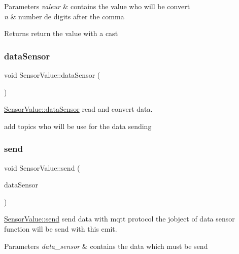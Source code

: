 \begin{DoxyParams}{Parameters}
{\em valeur} & contains the value who will be convert \\
\hline
{\em n} & number de digits after the comma \\
\hline
\end{DoxyParams}
\begin{DoxyReturn}{Returns}
return the value with a cast 
\end{DoxyReturn}
\mbox{\label{classSensorValue_af24ff9ad2ade8fe703c4d67ae91fe3b5}} 
\subsubsection{\texorpdfstring{data\+Sensor}{dataSensor}}
{\footnotesize\ttfamily void Sensor\+Value\+::data\+Sensor (\begin{DoxyParamCaption}{ }\end{DoxyParamCaption})\hspace{0.3cm}{\ttfamily [slot]}}



\hyperlink{classSensorValue_af24ff9ad2ade8fe703c4d67ae91fe3b5}{Sensor\+Value\+::data\+Sensor} read and convert data. 

add topics who will be use for the data sending \mbox{\label{classSensorValue_afa482d6ee6d1da567aad5c31f0118403}} 
\subsubsection{\texorpdfstring{send}{send}}
{\footnotesize\ttfamily void Sensor\+Value\+::send (\begin{DoxyParamCaption}\item[{Q\+Json\+Object}]{data\+Sensor }\end{DoxyParamCaption})\hspace{0.3cm}{\ttfamily [slot]}}



\hyperlink{classSensorValue_afa482d6ee6d1da567aad5c31f0118403}{Sensor\+Value\+::send} send data with mqtt protocol the jobject of data sensor function will be send with this emit. 


\begin{DoxyParams}{Parameters}
{\em data\+\_\+sensor} & contains the data which must be send \\
\hline
\end{DoxyParams}
\mbox{\label{classSensorValue_acf9b28e185a3f5c8c43bc409eb6d6723}} 
